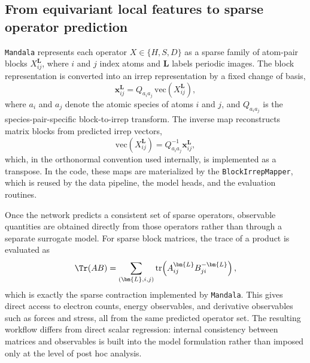 \subsection{From equivariant local features to sparse operator prediction}
\label{subsec:matrix_observable_background}

\texttt{Mandala} represents each operator $X \in \{H,S,D\}$ as a sparse family of
atom-pair blocks $X_{ij}^{\bm{L}}$, where $i$ and $j$ index atoms and
$\bm{L}$ labels periodic images. The block representation is converted into an
irrep representation by a fixed change of basis,
\begin{equation}
\bm{x}_{ij}^{\bm{L}} = Q_{a_i a_j} \, \mathrm{vec}\!\left(X_{ij}^{\bm{L}}\right),
\end{equation}
where $a_i$ and $a_j$ denote the atomic species of atoms $i$ and $j$, and
$Q_{a_i a_j}$ is the species-pair-specific block-to-irrep transform. The
inverse map reconstructs matrix blocks from predicted irrep vectors,
\begin{equation}
\mathrm{vec}\!\left(X_{ij}^{\bm{L}}\right)
=
Q_{a_i a_j}^{-1} \bm{x}_{ij}^{\bm{L}},
\end{equation}
which, in the orthonormal convention used internally, is implemented as a
transpose. In the code, these maps are materialized by the
\texttt{BlockIrrepMapper}, which is reused by the data pipeline, the model
heads, and the evaluation routines.

Once the network predicts a consistent set of sparse operators, observable
quantities are obtained directly from those operators rather than through a
separate surrogate model. For sparse block matrices, the trace of a product is
evaluated as
\begin{equation}
\Tr(AB)
=
\sum_{(\bm{L},i,j)}
\mathrm{tr}\!\left(
A_{ij}^{\bm{L}} B_{ji}^{-\bm{L}}
\right),
\end{equation}
which is exactly the sparse contraction implemented by \texttt{Mandala}. This gives
direct access to electron counts, energy observables, and
derivative observables such as forces and stress, all from the same predicted
operator set. The resulting workflow differs from direct scalar regression:
internal consistency between matrices and observables is built into the model
formulation rather than imposed only at the level of post hoc analysis.
